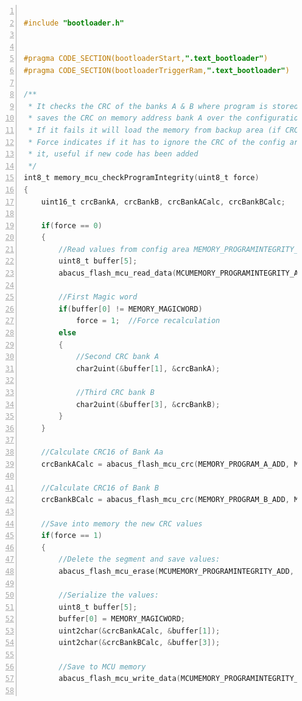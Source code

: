 \documentclass[LaM,binding=0.6cm,oneside]{../sapthesis}
\begin{document}
\begin{lstlisting}[language=C,
                   basicstyle=\scriptsize,
                   numbers=left,
                   stepnumber=0,
                   numbersep=4pt,
                   tabsize=2,
                   showspaces=false,
                   showstringspaces=false]

#include "bootloader.h"


#pragma CODE_SECTION(bootloaderStart,".text_bootloader")
#pragma CODE_SECTION(bootloaderTriggerRam,".text_bootloader")

/**
 * It checks the CRC of the banks A & B where program is stored and
 * saves the CRC on memory address bank A over the configuration address
 * If it fails it will load the memory from backup area (if CRC is also correct)
 * Force indicates if it has to ignore the CRC of the config area and recalculate
 * it, useful if new code has been added
 */
int8_t memory_mcu_checkProgramIntegrity(uint8_t force)
{
    uint16_t crcBankA, crcBankB, crcBankACalc, crcBankBCalc;

    if(force == 0)
    {
        //Read values from config area MEMORY_PROGRAMINTEGRITY_ADD for banks A and B
        uint8_t buffer[5];
        abacus_flash_mcu_read_data(MCUMEMORY_PROGRAMINTEGRITY_ADD, buffer, 5);

        //First Magic word
        if(buffer[0] != MEMORY_MAGICWORD)
            force = 1;  //Force recalculation
        else
        {
            //Second CRC bank A
            char2uint(&buffer[1], &crcBankA);

            //Third CRC bank B
            char2uint(&buffer[3], &crcBankB);
        }
    }

    //Calculate CRC16 of Bank Aa
    crcBankACalc = abacus_flash_mcu_crc(MEMORY_PROGRAM_A_ADD, MEMORY_PROGRAM_A_SIZE);

    //Calculate CRC16 of Bank B
    crcBankBCalc = abacus_flash_mcu_crc(MEMORY_PROGRAM_B_ADD, MEMORY_PROGRAM_B_SIZE);

    //Save into memory the new CRC values
    if(force == 1)
    {
        //Delete the segment and save values:
        abacus_flash_mcu_erase(MCUMEMORY_PROGRAMINTEGRITY_ADD, 512);

        //Serialize the values:
        uint8_t buffer[5];
        buffer[0] = MEMORY_MAGICWORD;
        uint2char(&crcBankACalc, &buffer[1]);
        uint2char(&crcBankBCalc, &buffer[3]);

        //Save to MCU memory
        abacus_flash_mcu_write_data(MCUMEMORY_PROGRAMINTEGRITY_ADD, buffer, 5);


\end{lstlisting}
\end{document}
